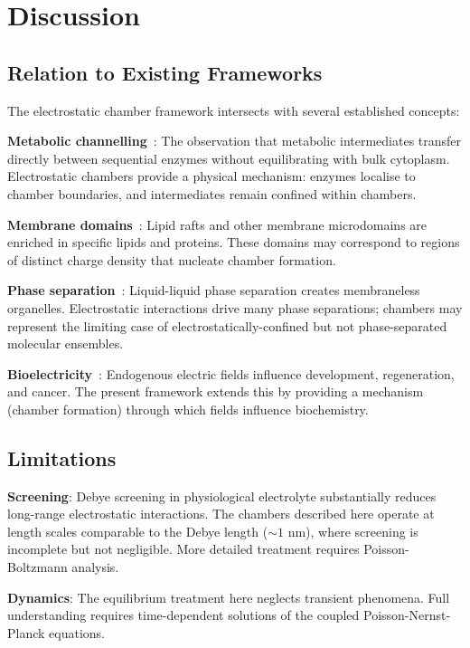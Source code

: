 \documentclass[twocolumn,10pt,aps,prd,superscriptaddress,floatfix,nofootinbib]{revtex4-2}
\theoremstyle{remark}
\begin{document}
\section{Discussion}
\label{sec:discussion}

\subsection{Relation to Existing Frameworks}

The electrostatic chamber framework intersects with several established concepts:

\textbf{Metabolic channelling}~\cite{Srere1987,Sweetlove2018}: The observation that metabolic intermediates transfer directly between sequential enzymes without equilibrating with bulk cytoplasm. Electrostatic chambers provide a physical mechanism: enzymes localise to chamber boundaries, and intermediates remain confined within chambers.

\textbf{Membrane domains}~\cite{Simons1997,Lingwood2010}: Lipid rafts and other membrane microdomains are enriched in specific lipids and proteins. These domains may correspond to regions of distinct charge density that nucleate chamber formation.

\textbf{Phase separation}~\cite{Hyman2014,Banani2017}: Liquid-liquid phase separation creates membraneless organelles. Electrostatic interactions drive many phase separations; chambers may represent the limiting case of electrostatically-confined but not phase-separated molecular ensembles.

\textbf{Bioelectricity}~\cite{Levin2014}: Endogenous electric fields influence development, regeneration, and cancer. The present framework extends this by providing a mechanism (chamber formation) through which fields influence biochemistry.

\subsection{Limitations}

\textbf{Screening}: Debye screening in physiological electrolyte substantially reduces long-range electrostatic interactions. The chambers described here operate at length scales comparable to the Debye length ($\sim 1$ nm), where screening is incomplete but not negligible. More detailed treatment requires Poisson-Boltzmann analysis.

\textbf{Dynamics}: The equilibrium treatment here neglects transient phenomena. Full understanding requires time-dependent solutions of the coupled Poisson-Nernst-Planck equations.
\end{document}
